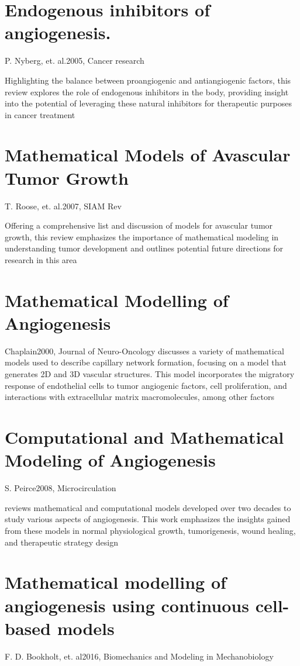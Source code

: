 \section{Endogenous inhibitors of angiogenesis.}{P. Nyberg, et. al.}{2005, Cancer research}

Highlighting the balance between proangiogenic and antiangiogenic factors, this review explores the role of endogenous inhibitors in the body, providing insight into the potential of leveraging these natural inhibitors for therapeutic purposes in cancer treatment \cite{Nyberg2005}

\section{Mathematical Models of Avascular Tumor Growth}{T. Roose, et. al.}{2007, SIAM Rev}

Offering a comprehensive list and discussion of models for avascular tumor growth, this review emphasizes the importance of mathematical modeling in understanding tumor development and outlines potential future directions for research in this area \cite{Roose2007}

\section{Mathematical Modelling of Angiogenesis}{Chaplain}{2000, Journal of Neuro-Oncology}
discusses a variety of mathematical models used to describe capillary network formation, focusing on a model that generates 2D and 3D vascular structures. This model incorporates the migratory response of endothelial cells to tumor angiogenic factors, cell proliferation, and interactions with extracellular matrix macromolecules, among other factors \cite{Chaplain2000}

\section{Computational and Mathematical Modeling of Angiogenesis}{S. Peirce}{2008, Microcirculation}

reviews mathematical and computational models developed over two decades to study various aspects of angiogenesis. This work emphasizes the insights gained from these models in normal physiological growth, tumorigenesis, wound healing, and therapeutic strategy design \cite{Peirce2008}


\section{Mathematical modelling of angiogenesis using continuous cell-based models}{F. D. Bookholt, et. al}{2016, Biomechanics and Modeling in Mechanobiology}


